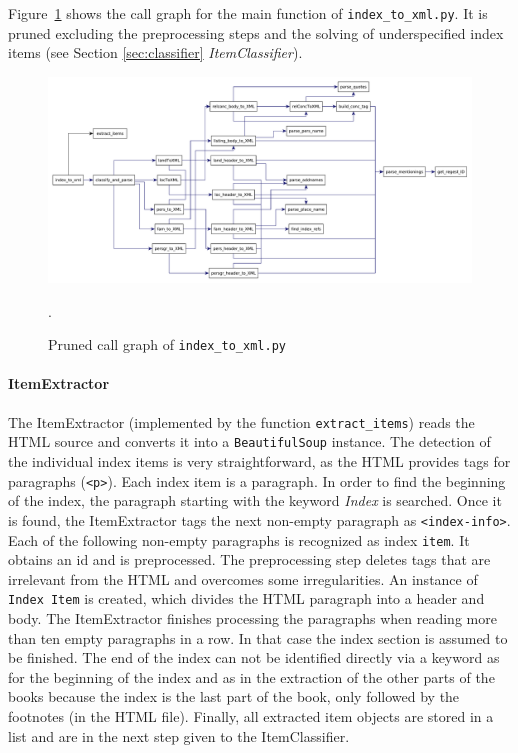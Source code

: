 Figure~\ref{fig:index-to-xml} shows the call graph for the main function of \texttt{index\_to\_xml.py}. It is pruned excluding the preprocessing steps and the solving of underspecified index items (see Section \ref{sec:classifier} \textit{ItemClassifier}).

\begin{figure}[h]
  \centering
  \includegraphics[scale=0.37]{img/index-to-xml}
  \caption{Pruned call graph of \texttt{index\_to\_xml.py}}.
  \label{fig:index-to-xml}
\end{figure}

\paragraph{ItemExtractor}
The ItemExtractor (implemented by the function \texttt{extract\_items}) reads the HTML source and converts it into a \texttt{BeautifulSoup} instance. The detection of the individual index items is very straightforward, as the HTML provides tags for paragraphs (\texttt{<p>}). Each index item is a paragraph. In order to find the beginning of the index, the paragraph starting with the keyword \textit{Index} is searched. Once it is found, the ItemExtractor tags the next non-empty paragraph as \texttt{<index-info>}. Each of the following non-empty paragraphs is recognized as index \texttt{item}. It obtains an id and is preprocessed. The preprocessing step deletes tags that are irrelevant from the HTML and overcomes some irregularities. An instance of \texttt{Index Item} is created, which divides the HTML paragraph into a header and body. The ItemExtractor finishes processing the paragraphs when reading more than ten empty paragraphs in a row. In that case the index section is assumed to be finished. The end of the index can not be identified directly via a keyword as for the beginning of the index and as in the extraction of the other parts of the books because the index is the last part of the book, only followed by the footnotes (in the HTML file). Finally, all extracted item objects are stored in a list and are in the next step given to the ItemClassifier.

